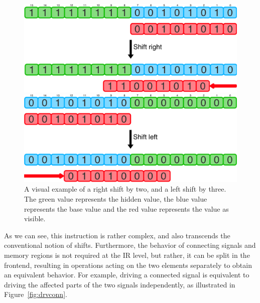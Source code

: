 \begin{figure}[ht]
    \centering
    \begin{minipage}{0.49\textwidth}
        \includegraphics[width=\textwidth]{gfx/ShiftRight.png}
    \end{minipage}
    \hfill
    \begin{minipage}{0.49\textwidth}
        \includegraphics[width=\textwidth]{gfx/ShiftLeft.png}
    \end{minipage}
    \caption[A visual example of a right and a left shift.]{A visual example of a right shift by two, and a left shift by three. The green value represents the hidden value, the blue value represents the base value and the red value represents the value as visible.}
    \label{fig:shr}
\end{figure}

As we can see, this instruction is rather complex, and also transcends the conventional notion of shifts. Furthermore, the behavior of connecting signals and memory regions is not required at the IR level, but rather, it can be split in the frontend, resulting in operations acting on the two elements separately to obtain an equivalent behavior. For example, driving a connected signal is equivalent to driving the affected parts of the two signals independently, as illustrated in Figure~\ref{fig:drvconn}.

